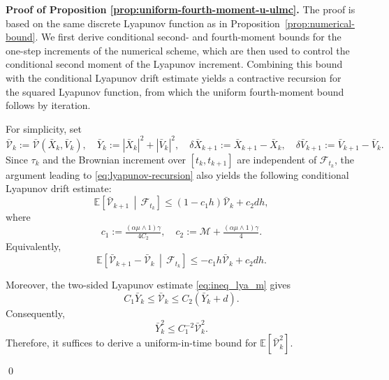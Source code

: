 \documentclass[12pt]{article}
\newenvironment{redtext}
  {\color{black}\ignorespaces}
  {\ignorespacesafterend}
\numberwithin{equation}{section}
\renewenvironment{proof}%
  {\begin{trivlist}%
   \item[]\ignorespaces}%
  {\qed\end{trivlist}}
\newcommand{\M}{\mathcal{M}}
\begin{document}
\begin{redtext}




\begin{proof}
\textbf{Proof of Proposition \ref{prop:uniform-fourth-moment-u-ulmc}.}
The proof is based on the same discrete Lyapunov function as in Proposition~\ref{prop:numerical-bound}. 
We first derive conditional second- and fourth-moment bounds for the one-step increments of the numerical scheme, which are then used to control the conditional second moment of the Lyapunov increment. 
Combining this bound with the conditional Lyapunov drift estimate yields a contractive recursion for the squared Lyapunov function, from which the uniform fourth-moment bound follows by iteration.


For simplicity, set
\[
\bar{\mathcal V}_k
:=
\bar{\mathcal V}(\bar X_k,\bar V_k),
\quad
\bar Y_k
:=
|\bar X_k|^2+|\bar V_k|^2,
\quad 
\delta 
\bar{X}_{k+1} 
:=
\bar{X}_{k+1}-\bar{X}_{k},
\quad 
\delta 
\bar{V}_{k+1} 
:=
\bar{V}_{k+1}-\bar{V}_{k}.
\]
Since $\tau_k$ and the Brownian increment over
$[t_k,t_{k+1}]$ are independent of $\mathcal F_{t_k}$, the
argument leading to \eqref{eq:lyapunov-recursion} also yields the
following conditional Lyapunov drift estimate:
\begin{equation}
\label{eq:conditional-lyapunov-drift-fourth}
\mathbb E
\left[
\bar{\mathcal V}_{k+1}
\,\middle|\,
\mathcal F_{t_k}
\right]
\leq
\left(
1-
c_1 h
\right)
\bar{\mathcal V}_k
+
c_2 dh,
\end{equation}
where  
\begin{equation}
c_1
:=
\tfrac{(\alpha\mu\wedge1)\gamma}{4C_2},
\quad 
c_2
:=
\M+
\tfrac{(\alpha\mu\wedge1)\gamma}{4}.
\end{equation}
Equivalently,
\begin{equation}
\label{eq:conditional-lyapunov-increment-fourth}
\mathbb E
\left[
\bar{\mathcal V}_{k+1}-\bar{\mathcal V}_k
\,\middle|\,
\mathcal F_{t_k}
\right]
\leq
-
c_1
h\bar{\mathcal V}_k
+
c_2 dh.
\end{equation}

Moreover, the two-sided Lyapunov estimate
\eqref{eq:ineq_lya_m} gives
\begin{equation}
\label{eq:Lyapunov-energy-equivalence-fourth}
C_1 \bar Y_k
\leq
\bar{\mathcal V}_k
\leq
C_2(\bar Y_k+d).
\end{equation}
Consequently,
\[
\bar Y_k^2
\leq
C_1^{-2}\bar{\mathcal V}_k^2.
\]
Therefore, it suffices to derive a uniform-in-time bound for
$\mathbb E[\bar{\mathcal V}_k^2]$.



\end{proof}
\end{redtext}
\end{document}
